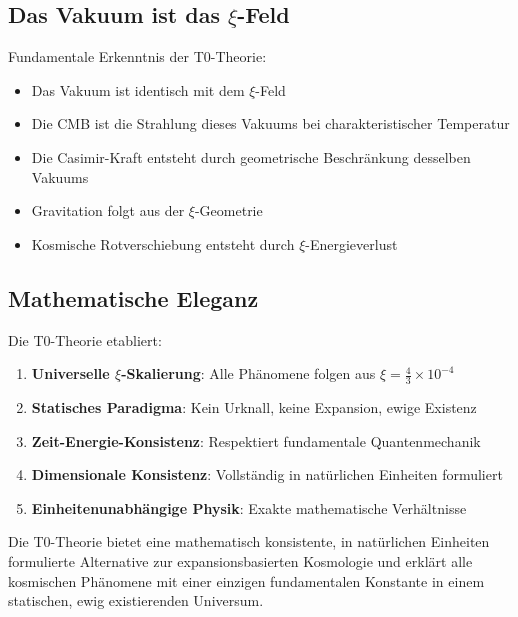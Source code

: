 \documentclass[12pt,a4paper]{article}
\begin{document}
	\subsection{Das Vakuum ist das $\xi$-Feld}
	
	\begin{important}
		Fundamentale Erkenntnis der T0-Theorie:
		\begin{itemize}
			\item Das Vakuum ist identisch mit dem $\xi$-Feld
			\item Die CMB ist die Strahlung dieses Vakuums bei charakteristischer Temperatur
			\item Die Casimir-Kraft entsteht durch geometrische Beschränkung desselben Vakuums
			\item Gravitation folgt aus der $\xi$-Geometrie
			\item Kosmische Rotverschiebung entsteht durch $\xi$-Energieverlust
		\end{itemize}
	\end{important}
	
	\subsection{Mathematische Eleganz}
	
	Die T0-Theorie etabliert:
	\begin{enumerate}
		\item \textbf{Universelle $\xi$-Skalierung}: Alle Phänomene folgen aus $\xi = \frac{4}{3} \times 10^{-4}$
		\item \textbf{Statisches Paradigma}: Kein Urknall, keine Expansion, ewige Existenz
		\item \textbf{Zeit-Energie-Konsistenz}: Respektiert fundamentale Quantenmechanik
		\item \textbf{Dimensionale Konsistenz}: Vollständig in natürlichen Einheiten formuliert
		\item \textbf{Einheitenunabhängige Physik}: Exakte mathematische Verhältnisse
	\end{enumerate}
	
	\begin{revolutionary}
		Die T0-Theorie bietet eine mathematisch konsistente, in natürlichen Einheiten formulierte Alternative zur expansionsbasierten Kosmologie und erklärt alle kosmischen Phänomene mit einer einzigen fundamentalen Konstante in einem statischen, ewig existierenden Universum.
	\end{revolutionary}
	
\end{document}
